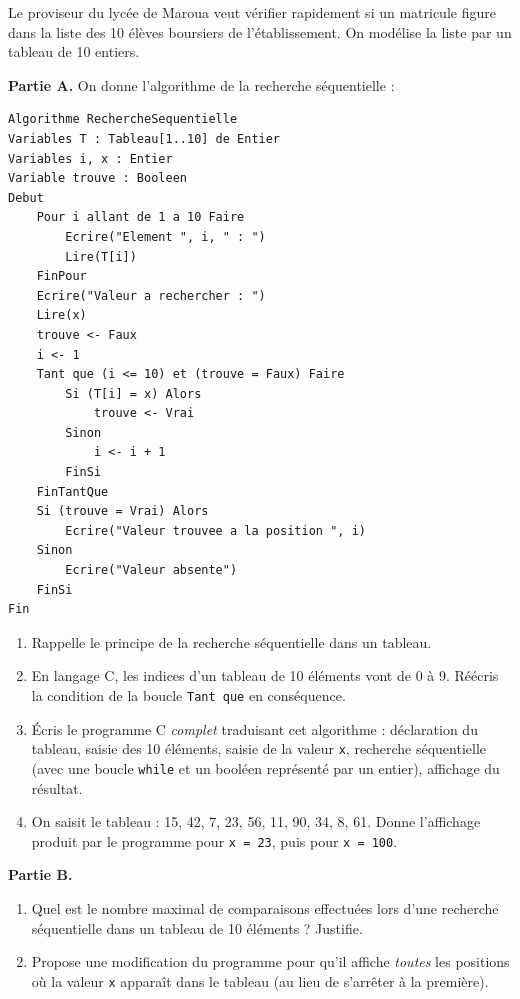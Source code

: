 \documentclass[11pt]{article}
\begin{document}
\begin{exercice}
Le proviseur du lycée de Maroua veut vérifier rapidement si un matricule figure dans la liste des 10 élèves boursiers de l'établissement. On modélise la liste par un tableau de 10 entiers.

\textbf{Partie A.} On donne l'algorithme de la recherche séquentielle :

\begin{lstlisting}
Algorithme RechercheSequentielle
Variables T : Tableau[1..10] de Entier
Variables i, x : Entier
Variable trouve : Booleen
Debut
    Pour i allant de 1 a 10 Faire
        Ecrire("Element ", i, " : ")
        Lire(T[i])
    FinPour
    Ecrire("Valeur a rechercher : ")
    Lire(x)
    trouve <- Faux
    i <- 1
    Tant que (i <= 10) et (trouve = Faux) Faire
        Si (T[i] = x) Alors
            trouve <- Vrai
        Sinon
            i <- i + 1
        FinSi
    FinTantQue
    Si (trouve = Vrai) Alors
        Ecrire("Valeur trouvee a la position ", i)
    Sinon
        Ecrire("Valeur absente")
    FinSi
Fin
\end{lstlisting}

\begin{enumerate}
  \item Rappelle le principe de la recherche séquentielle dans un tableau.
  \item En langage C, les indices d'un tableau de 10 éléments vont de 0 à 9. Réécris la condition de la boucle \texttt{Tant que} en conséquence.
  \item Écris le programme C \emph{complet} traduisant cet algorithme : déclaration du tableau, saisie des 10 éléments, saisie de la valeur \texttt{x}, recherche séquentielle (avec une boucle \texttt{while} et un booléen représenté par un entier), affichage du résultat.
  \item On saisit le tableau : 15, 42, 7, 23, 56, 11, 90, 34, 8, 61. Donne l'affichage produit par le programme pour \texttt{x = 23}, puis pour \texttt{x = 100}.
\end{enumerate}

\textbf{Partie B.}
\begin{enumerate}
  \item[5.] Quel est le nombre maximal de comparaisons effectuées lors d'une recherche séquentielle dans un tableau de 10 éléments ? Justifie.
  \item[6.] Propose une modification du programme pour qu'il affiche \emph{toutes} les positions où la valeur \texttt{x} apparaît dans le tableau (au lieu de s'arrêter à la première).
\end{enumerate}
\end{exercice}
\end{document}
